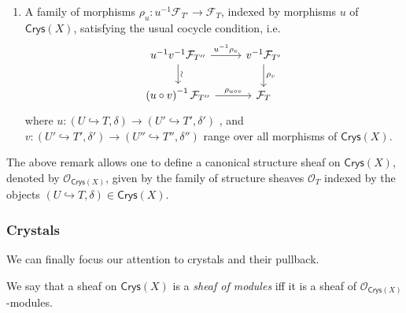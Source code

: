 \begin{rem}
\begin{enumerate}
		\item A family of morphisms $\rho_u\colon u^{-1}\mathcal{F}_{T'} \to \mathcal{F}_T$,
			indexed by morphisms 
			$u$ of $\mathsf{Crys}(X)$,
			satisfying the usual cocycle condition, i.e.
			\begin{equation*}
			\begin{tikzcd}
				u^{-1} v^{-1} \mathcal{F}_{T''} 
				\arrow[r, "u^{-1}\rho_v", rightarrow] 
				\arrow[d, "\rotatebox{90}{\(\sim\)}", rightarrow] &
				v^{-1} \mathcal{F}_{T'} 
				\arrow[d, "\rho_v", rightarrow] \\
				\left( u \circ v \right)^{-1} \mathcal{F}_{T''}
				\arrow[r, "\rho_{u \circ v}", rightarrow] &
				\mathcal{F}_T
			\end{tikzcd}
			\end{equation*}
			where $u\colon \left(U \hookrightarrow T, \delta\right) \to 
			\left(U' \hookrightarrow T', \delta'\right)$ ,
			and $v\colon \left(U' \hookrightarrow T', \delta'\right) \to 
			\left(U'' \hookrightarrow T'', \delta''\right)$
			range over all morphisms of $\mathsf{Crys}(X)$.
	\end{enumerate}
\end{rem}


\begin{ex}
	The above remark allows one to define a canonical structure sheaf
	on $\mathsf{Crys}(X)$, denoted by $\mathcal{O}_{\mathsf{Crys}(X)}$,
	given by the family of structure sheaves $\mathcal{O}_T$
	indexed by the objects 
	$\left(U \hookrightarrow T, \delta\right) \in \mathsf{Crys}(X)$.
\end{ex}



\subsubsection{Crystals}
We can finally focus our attention to crystals and their pullback.


\begin{defn}
	We say that a sheaf on $\mathsf{Crys}(X)$ is a {\em sheaf of modules}
	iff it is a sheaf of $\mathcal{O}_{\mathsf{Crys}(X)}$-modules.
\end{defn}


